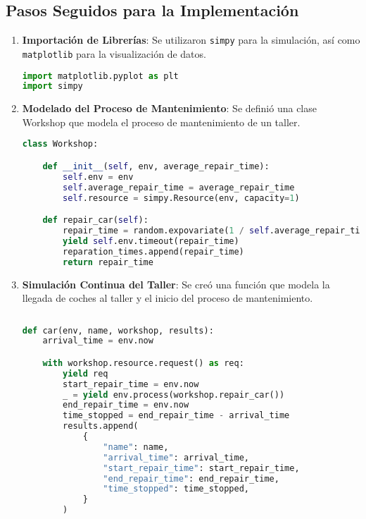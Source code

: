 \subsection{Pasos Seguidos para la Implementación}\label{subsec:pasos-seguidos-para-la-implementacion}

\begin{enumerate}
    \item \textbf{Importación de Librerías}: Se utilizaron \texttt{simpy} para la simulación, así como \texttt{matplotlib} para la visualización de datos.

    \begin{lstlisting}[language=Python, caption=Importación de Librerías,label={lst:lstlisting}]
import matplotlib.pyplot as plt
import simpy
    \end{lstlisting}

    \item \textbf{Modelado del Proceso de Mantenimiento}: Se definió una clase Workshop que modela el proceso de mantenimiento de un taller.

    \begin{lstlisting}[language=Python, caption=Clase Workshop,label={lst:lstlisting2}]
class Workshop:

    def __init__(self, env, average_repair_time):
        self.env = env
        self.average_repair_time = average_repair_time
        self.resource = simpy.Resource(env, capacity=1)

    def repair_car(self):
        repair_time = random.expovariate(1 / self.average_repair_time)
        yield self.env.timeout(repair_time)
        reparation_times.append(repair_time)
        return repair_time

    \end{lstlisting}

    \pagebreak
    \item \textbf{Simulación Continua del Taller}: Se creó una función que modela la llegada de coches al taller y el inicio del proceso de mantenimiento.

    \begin{lstlisting}[language=Python, caption=Función de simulación de llegada de autos,label={lst:lstlisting3}]
        
def car(env, name, workshop, results):
    arrival_time = env.now

    with workshop.resource.request() as req:
        yield req
        start_repair_time = env.now
        _ = yield env.process(workshop.repair_car())
        end_repair_time = env.now
        time_stopped = end_repair_time - arrival_time
        results.append(
            {
                "name": name,
                "arrival_time": arrival_time,
                "start_repair_time": start_repair_time,
                "end_repair_time": end_repair_time,
                "time_stopped": time_stopped,
            }
        )



\end{lstlisting}
\end{enumerate}
